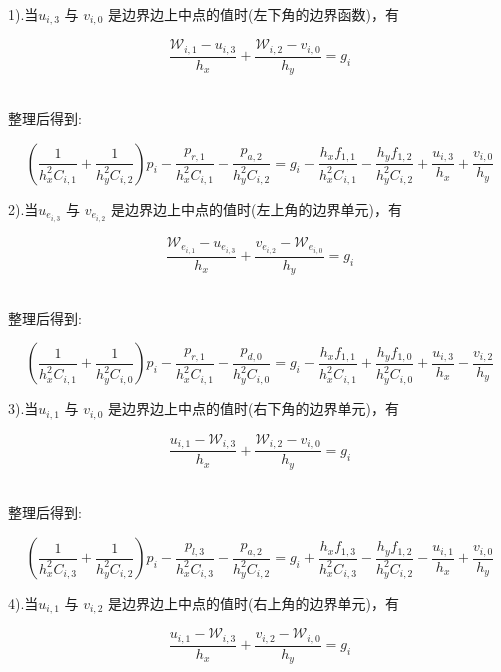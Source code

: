 \documentclass[leqno]{article}
\begin{document}
1).当$u_{i,3}$ 与 $v_{i,0}$ 是边界边上中点的值时(左下角的边界函数)，有

\begin{equation*}
\frac{\mathcal{W}_{i,1} - u_{i,3}}{h_x} + \frac{\mathcal{W}_{i,2} - v_{i,0}}{h_y} = g_i
\end{equation*}　

整理后得到:

\begin{equation*}
(\frac{1}{h_x^2C_{i,1}} + \frac{1}{h_y^2C_{i,2}})p_i - \frac{p_{r,1}}{h_x^2C_{i,1}} - \frac{p_{a,2}}{h_y^2C_{i,2}} = g_i - \frac{h_xf_{1,1}}{h_x^2C_{i,1}} - \frac{h_yf_{1,2}}{h_y^2C_{i,2}} + \frac{u_{i,3}}{h_x} + \frac{v_{i,0}}{h_y}
\end{equation*}

2).当$u_{e_{i,3}}$ 与 $v_{e_{i,2}}$ 是边界边上中点的值时(左上角的边界单元)，有

\begin{equation*}
\frac{\mathcal{W}_{e_{i,1}} - u_{e_{i,3}}}{h_x} + \frac{ v_{e_{i,2}} - \mathcal{W}_{e_{i,0}}}{h_y} = g_i
\end{equation*}　

整理后得到:

\begin{equation*}
(\frac{1}{h_x^2C_{i,1}} + \frac{1}{h_y^2C_{i,0}})p_i - \frac{p_{r,1}}{h_x^2C_{i,1}} - \frac{p_{d,0}}{h_y^2C_{i,0}} = g_i - \frac{h_xf_{1,1}}{h_x^2C_{i,1}} + \frac{h_yf_{1,0}}{h_y^2C_{i,0}} + \frac{u_{i,3}}{h_x} - \frac{v_{i,2}}{h_y}
\end{equation*}

3).当$u_{i,1}$ 与 $v_{i,0}$ 是边界边上中点的值时(右下角的边界单元)，有

\begin{equation*}
\frac{ u_{i,1} - \mathcal{W}_{i,3}}{h_x} + \frac{\mathcal{W}_{i,2} - v_{i,0}}{h_y} = g_i
\end{equation*}　

整理后得到:

\begin{equation*}
(\frac{1}{h_x^2C_{i,3}} + \frac{1}{h_y^2C_{i,2}})p_i - \frac{p_{l,3}}{h_x^2C_{i,3}} - \frac{p_{a,2}}{h_y^2C_{i,2}} = g_i + \frac{h_xf_{1,3}}{h_x^2C_{i,3}} - \frac{h_yf_{1,2}}{h_y^2C_{i,2}} - \frac{u_{i,1}}{h_x} + \frac{v_{i,0}}{h_y}
\end{equation*}

4).当$u_{i,1}$ 与 $v_{i,2}$ 是边界边上中点的值时(右上角的边界单元)，有

\begin{equation*}
\frac{ u_{i,1} - \mathcal{W}_{i,3}}{h_x} + \frac{ v_{i,2} - \mathcal{W}_{i,0}}{h_y} = g_i
\end{equation*}　
\end{document}
